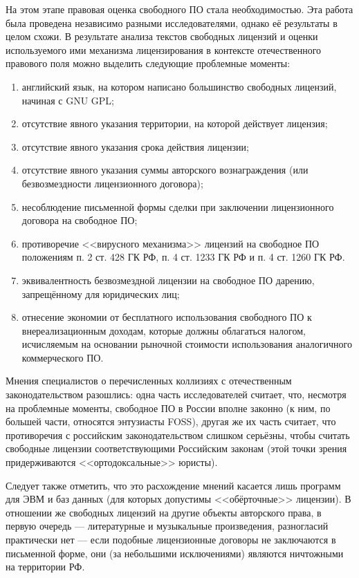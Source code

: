 \documentclass[10pt, a5paper]{article}
\begin{document}
На этом этапе правовая оценка свободного ПО стала необходимостью. Эта работа была проведена независимо разными исследователями, однако её результаты в целом схожи. В результате анализа текстов свободных лицензий и оценки используемого ими механизма лицензирования в контексте отечественного правового поля можно выделить следующие проблемные моменты:
\begin{enumerate}
	\item английский язык, на котором написано большинство свободных лицензий, начиная с GNU GPL;
	\item отсутствие явного указания территории, на которой действует лицензия;
	\item отсутствие явного указания срока действия лицензии;
	\item отсутствие явного указания суммы авторского вознаграждения (или безвозмездности лицензионного договора);
	\item несоблюдение письменной формы сделки при заключении лицензионного договора на свободное ПО;
	\item противоречие <<вирусного механизма>> лицензий на свободное ПО положениям п. 2 ст. 428 ГК РФ, п. 4 ст. 1233 ГК РФ и п. 4 ст. 1260 ГК РФ.
	\item эквивалентность безвозмездной лицензии на свободное ПО дарению, запрещённому для юридических лиц;
	\item отнесение экономии от бесплатного использования свободного ПО к внереализационным доходам, которые должны облагаться налогом, исчисляемым на основании рыночной стоимости использования аналогичного коммерческого ПО.
\end{enumerate}

Мнения специалистов о перечисленных коллизиях с отечественным законодательством разошлись: одна часть исследователей считает, что, несмотря на проблемные моменты, свободное ПО в России вполне законно (к ним, по большей части, относятся энтузиасты FOSS), другая же их часть считает, что противоречия с российским законодательством слишком серьёзны, чтобы считать свободные лицензии соответствующими Российским законам (этой точки зрения придерживаются <<ортодоксальные>> юристы). 

Следует также отметить, что это расхождение мнений касается лишь программ для ЭВМ и баз данных (для которых допустимы <<обёрточные>> лицензии). В отношении же свободных лицензий на другие объекты авторского права, в первую очередь --- литературные и музыкальные произведения, разногласий практически нет --- если подобные лицензионные договоры не заключаются в письменной форме, они (за небольшими исключениями) являются ничтожными на территории РФ.
\end{document}
